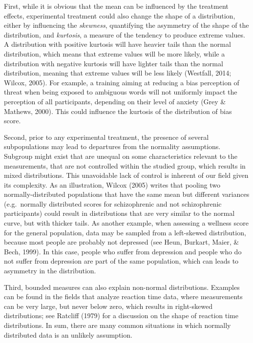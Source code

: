 \documentclass[man,floatsintext]{apa6}
\begin{document}
First, while it is obvious that the mean can be influenced by the treatment effects, experimental treatment could also change the shape of a distribution, either by influencing the \emph{skewness}, quantifying the asymmetry of the shape of the distribution, and \emph{kurtosis}, a measure of the tendency to produce extreme values. A distribution with positive kurtosis will have heavier tails than the normal distribution, which means that extreme values will be more likely, while a distribution with negative kurtosis will have lighter tails than the normal distribution, meaning that extreme values will be less likely (Westfall, 2014; Wilcox, 2005). For example, a training aiming at reducing a bias perception of threat when being exposed to ambiguous words will not uniformly impact the perception of all participants, depending on their level of anxiety (Grey \& Mathews, 2000). This could influence the kurtosis of the distribution of bias score.

Second, prior to any experimental treatment, the presence of several subpopulations may lead to departures from the normality assumptions. Subgroup might exist that are unequal on some characteristics relevant to the measurements, that are not controlled within the studied group, which results in mixed distributions. This unavoidable lack of control is inherent of our field given its complexity. As an illustration, Wilcox (2005) writes that pooling two normally-distributed populations that have the same mean but different variances (e.g.~normally distributed scores for schizophrenic and not schizophrenic participants) could result in distributions that are very similar to the normal curve, but with thicker tails. As another example, when assessing a wellness score for the general population, data may be sampled from a left-skewed distribution, because most people are probably not depressed (see Heun, Burkart, Maier, \& Bech, 1999). In this case, people who suffer from depression and people who do not suffer from depression are part of the same population, which can leads to asymmetry in the distribution.

Third, bounded measures can also explain non-normal distributions. Examples can be found in the fields that analyze reaction time data, where measurements can be very large, but never below zero, which results in right-skewed distributions; see Ratcliff (1979) for a discussion on the shape of reaction time distributions. In sum, there are many common situations in which normally distributed data is an unlikely assumption.
\end{document}
